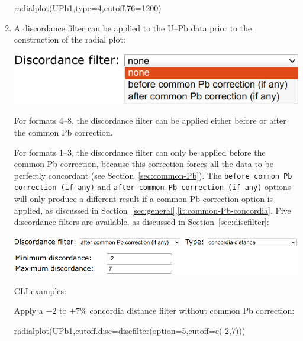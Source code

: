 \begin{refsection}
\begin{enumerate}
\begin{console}
radialplot(UPb1,type=4,cutoff.76=1200)
\end{console}

\item A discordance filter can be applied to the U--Pb data prior to
  the construction of the radial plot:
  
  \noindent\begin{minipage}[t]{.5\linewidth}
  \strut\vspace*{-\baselineskip}\newline
  \includegraphics[width=\linewidth]{../figures/UPbRadialDiscfilter.png}\\
\end{minipage}
  \begin{minipage}[t]{.5\linewidth}
    For formats 4--8, the discordance filter can be applied either
    before or after the common Pb correction.
  \end{minipage}

For formats 1--3, the discordance filter can only be applied before
the common Pb correction, because this correction forces all the data
to be perfectly concordant (see Section~\ref{sec:common-Pb}). The
\texttt{before common Pb correction (if any)} and \texttt{after common
  Pb correction (if any)} options will only produce a different result
if a common Pb correction option is applied, as discussed in
Section~\ref{sec:general}.\ref{it:common-Pb-concordia}. Five
discordance filters are available, as discussed in
Section~\ref{sec:discfilter}:
\begin{center}
\includegraphics[width=.9\linewidth]{../figures/UPbRadialConcordiaDiscfilter.png}
\end{center}
\noindent CLI examples:

\noindent Apply a $-2$ to $+7$\% concordia distance filter without common
  Pb correction:
\begin{console}
radialplot(UPb1,cutoff.disc=discfilter(option=5,cutoff=c(-2,7)))
\end{console}


\end{enumerate}
\end{refsection}
